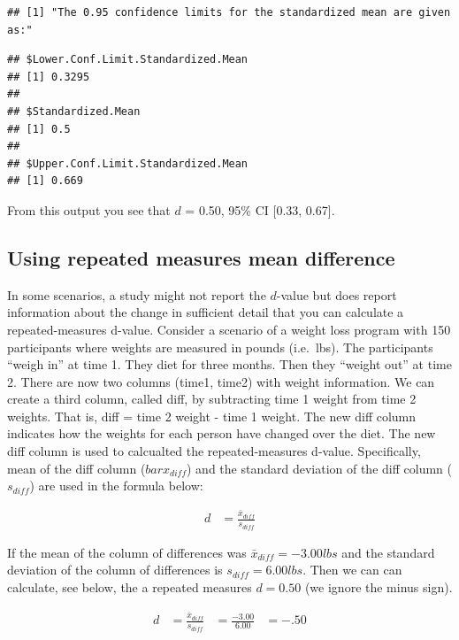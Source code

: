\documentclass[
]{krantz}
\begin{document}
\begin{verbatim}
## [1] "The 0.95 confidence limits for the standardized mean are given as:"
\end{verbatim}

\begin{verbatim}
## $Lower.Conf.Limit.Standardized.Mean
## [1] 0.3295
## 
## $Standardized.Mean
## [1] 0.5
## 
## $Upper.Conf.Limit.Standardized.Mean
## [1] 0.669
\end{verbatim}

From this output you see that \(d\) = 0.50, 95\% CI {[}0.33, 0.67{]}.

\hypertarget{using-repeated-measures-mean-difference}{%
\subsection{Using repeated measures mean difference}\label{using-repeated-measures-mean-difference}}

In some scenarios, a study might not report the \(d\)-value but does report information about the change in sufficient detail that you can calculate a repeated-measures d-value. Consider a scenario of a weight loss program with 150 participants where weights are measured in pounds (i.e.~lbs). The participants ``weigh in'' at time 1. They diet for three months. Then they ``weight out'' at time 2. There are now two columns (time1, time2) with weight information. We can create a third column, called diff, by subtracting time 1 weight from time 2 weights. That is, diff = time 2 weight - time 1 weight. The new diff column indicates how the weights for each person have changed over the diet. The new diff column is used to calcualted the repeated-measures d-value. Specifically, mean of the diff column (\(bar{x}_{diff}\)) and the standard deviation of the diff column (\(s_{diff}\)) are used in the formula below:

\[
\begin{aligned}
d & = \frac{\bar{x}_{diff}}{s_{diff}}
\end{aligned}
\]

If the mean of the column of differences was \(\bar{x}_{diff} = -3.00lbs\) and the standard deviation of the column of differences is \(s_{diff} = 6.00lbs\). Then we can can calculate, see below, the a repeated measures \(d = 0.50\) (we ignore the minus sign).

\[
\begin{aligned}
d & = \frac{\bar{x}_{diff}}{s_{diff}}
&= \frac{-3.00}{6.00}
&= -.50 
\end{aligned}
\]
\end{document}
